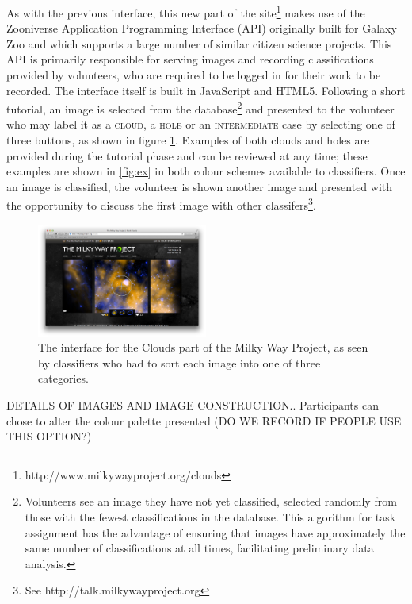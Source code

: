 \documentclass[a4,useAMS,usenatbib]{mn2e}
\begin{document}
As with the previous interface, this new part of the site\footnote{http://www.milkywayproject.org/clouds} makes use of the Zooniverse Application Programming Interface (API) originally built for Galaxy Zoo \citep{Lintottetal} and which supports a large number of similar citizen science projects. This API is primarily responsible for serving images and recording classifications provided by volunteers, who are required to be logged in for their work to be recorded. The interface itself is built in JavaScript and HTML5. Following a short tutorial, an image is selected from the database\footnote{Volunteers see an image they have not yet classified, selected randomly from those with the fewest classifications in the database. This algorithm for task assignment has the advantage of ensuring that images have approximately the same number of classifications at all times, facilitating preliminary data analysis.} and presented to the volunteer who may label it as a \textsc{cloud}, a \textsc{hole} or an \textsc{intermediate} case by selecting one of three buttons, as shown in figure \ref{fig:interface}. Examples of both clouds and holes are provided during the tutorial phase and can be reviewed at any time; these examples are shown in \ref{fig:ex} in both colour schemes available to classifiers. Once an image is classified, the volunteer is shown another image and presented with the opportunity to discuss the first image with other classifers\footnote{See http://talk.milkywayproject.org}. 

\begin{figure}
\includegraphics[angle=0,width=0.5\textwidth]{Interface.png}
\caption{The interface for the Clouds part of the Milky Way Project, as seen by classifiers who had to sort each image into one of three categories.}\label{fig:interface}
\end{figure}

DETAILS OF IMAGES AND IMAGE CONSTRUCTION.. Participants can chose to alter the colour palette presented (DO WE RECORD IF PEOPLE USE THIS OPTION?)
\end{document}
